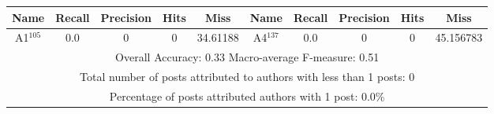 \begin{tabular}{|c|c|c|c|c||c|c|c|c|c|}
\hline 
Name & Recall & Precision & Hits & Miss &Name & Recall & Precision & Hits & Miss \\ 
\hline 
A1$^{105}$ & 0.0 & 0 & 0 & 34.61188 & A4$^{137}$ & 0.0 & 0 & 0 & 45.156783 \\ 
\hline 
\multicolumn{10}{|c|}{Overall Accuracy: 0.33 Macro-average F-measure: 0.51}\\ 
\multicolumn{10}{|c|}{Total number of posts attributed to authors with less than 1 posts: 0}\\ 
\multicolumn{10}{|c|}{Percentage of posts attributed authors with 1 post: 0.0\%}\\ 
\hline 
\end{tabular}